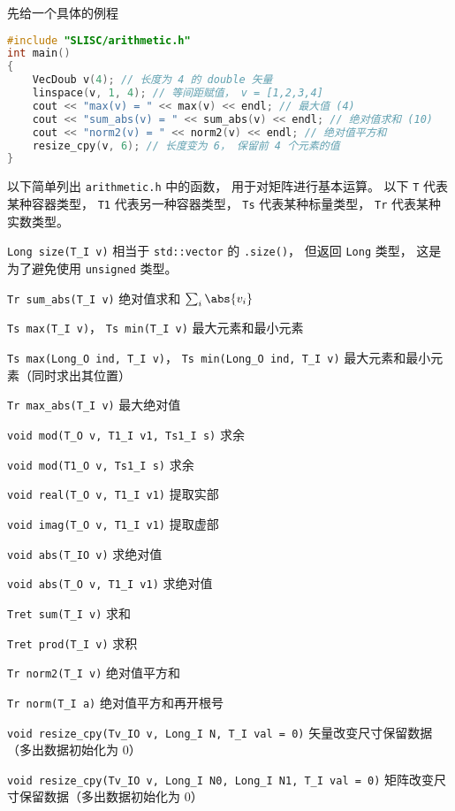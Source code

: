 

先给一个具体的例程
\begin{lstlisting}[language=cpp]
#include "SLISC/arithmetic.h"
int main()
{
    VecDoub v(4); // 长度为 4 的 double 矢量
    linspace(v, 1, 4); // 等间距赋值， v = [1,2,3,4]
    cout << "max(v) = " << max(v) << endl; // 最大值 (4)
    cout << "sum_abs(v) = " << sum_abs(v) << endl; // 绝对值求和 (10)
    cout << "norm2(v) = " << norm2(v) << endl; // 绝对值平方和
    resize_cpy(v, 6); // 长度变为 6， 保留前 4 个元素的值
}
\end{lstlisting}

以下简单列出 \verb|arithmetic.h| 中的函数， 用于对矩阵进行基本运算。 以下 \verb|T| 代表某种容器类型， \verb|T1| 代表另一种容器类型， \verb|Ts| 代表某种标量类型， \verb|Tr| 代表某种实数类型。

\verb|Long size(T_I v)| 相当于 \verb|std::vector| 的 \verb|.size()|， 但返回 \verb|Long| 类型， 这是为了避免使用 \verb|unsigned| 类型。

\verb|Tr sum_abs(T_I v)| 绝对值求和 $\sum_i \abs{v_i}$

\verb|Ts max(T_I v)|， \verb|Ts min(T_I v)| 最大元素和最小元素

\verb|Ts max(Long_O ind, T_I v)|， \verb|Ts min(Long_O ind, T_I v)| 最大元素和最小元素（同时求出其位置）

\verb|Tr max_abs(T_I v)| 最大绝对值

\verb|void mod(T_O v, T1_I v1, Ts1_I s)| 求余

\verb|void mod(T1_O v, Ts1_I s)| 求余

\verb|void real(T_O v, T1_I v1)| 提取实部

\verb|void imag(T_O v, T1_I v1)| 提取虚部

\verb|void abs(T_IO v)| 求绝对值

\verb|void abs(T_O v, T1_I v1)| 求绝对值

\verb|Tret sum(T_I v)| 求和

\verb|Tret prod(T_I v)| 求积

\verb|Tr norm2(T_I v)| 绝对值平方和

\verb|Tr norm(T_I a)| 绝对值平方和再开根号

\verb|void resize_cpy(Tv_IO v, Long_I N, T_I val = 0)| 矢量改变尺寸保留数据（多出数据初始化为 0）

\verb|void resize_cpy(Tv_IO v, Long_I N0, Long_I N1, T_I val = 0)| 矩阵改变尺寸保留数据（多出数据初始化为 0）

